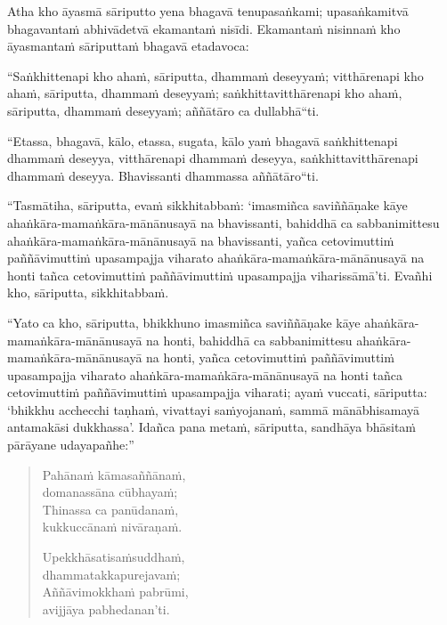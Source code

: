 \clearpage

{\raggedright

Atha kho āyasmā sāriputto yena bhagavā tenupasaṅkami; upasaṅkamitvā bhagavantaṁ abhivādetvā ekamantaṁ nisīdi. Ekamantaṁ nisinnaṁ kho āyasmantaṁ sāriputtaṁ bhagavā etadavoca:

``Saṅkhittenapi kho ahaṁ, sāriputta, dhammaṁ deseyyaṁ; vitthārenapi kho ahaṁ, sāriputta, dhammaṁ deseyyaṁ; saṅkhittavitthārenapi kho ahaṁ, sāriputta, dhammaṁ deseyyaṁ; aññātāro ca dullabhā``ti.

``Etassa, bhagavā, kālo, etassa, sugata, kālo yaṁ bhagavā saṅkhittenapi dhammaṁ deseyya, vitthārenapi dhammaṁ deseyya, saṅkhittavitthārenapi dhammaṁ deseyya. Bhavissanti dhammassa aññātāro``ti.

``Tasmātiha, sāriputta, evaṁ sikkhitabbaṁ: `imasmiñca saviññāṇake kāye ahaṅkāra-mamaṅkāra-mānānusayā na bhavissanti, bahiddhā ca sabbanimittesu ahaṅkāra-mamaṅkāra-mānānusayā na bhavissanti, yañca cetovimuttiṁ paññāvimuttiṁ upasampajja viharato ahaṅkāra-mamaṅkāra-mānānusayā na honti tañca cetovimuttiṁ paññāvimuttiṁ upasampajja viharissāmā'ti. Evañhi kho, sāriputta, sikkhitabbaṁ.

``Yato ca kho, sāriputta, bhikkhuno imasmiñca saviññāṇake kāye ahaṅkāra-mamaṅkāra-mānānusayā na honti, bahiddhā ca sabbanimittesu ahaṅkāra-mamaṅkāra-mānānusayā na honti, yañca cetovimuttiṁ paññāvimuttiṁ upasampajja viharato ahaṅkāra-mamaṅkāra-mānānusayā na honti tañca cetovimuttiṁ paññāvimuttiṁ upasampajja viharati; ayaṁ vuccati, sāriputta: `bhikkhu acchecchi taṇhaṁ, vivattayi saṁyojanaṁ, sammā mānābhisamayā antamakāsi dukkhassa'.
Idañca pana metaṁ, sāriputta, sandhāya bhāsitaṁ pārāyane udayapañhe:''

}

\begin{quote}
Pahānaṁ kāmasaññānaṁ,\\
domanassāna cūbhayaṁ;\\
Thinassa ca panūdanaṁ,\\
kukkuccānaṁ nivāraṇaṁ.

Upekkhāsatisaṁsuddhaṁ,\\
dhammatakkapurejavaṁ;\\
Aññāvimokkhaṁ pabrūmi,\\
avijjāya pabhedanan'ti.
\end{quote}
